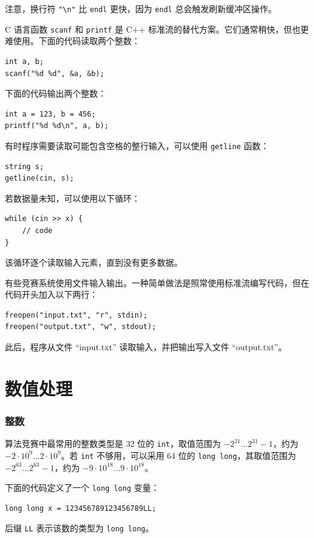 注意，换行符 \texttt{"\textbackslash n"} 比 \texttt{endl} 更快，因为 \texttt{endl} 总会触发刷新缓冲区操作。

C 语言函数 \texttt{scanf} 和 \texttt{printf} 是 C++ 标准流的替代方案。它们通常稍快，但也更难使用。下面的代码读取两个整数：
\begin{lstlisting}
int a, b;
scanf("%d %d", &a, &b);
\end{lstlisting}
下面的代码输出两个整数：
\begin{lstlisting}
int a = 123, b = 456;
printf("%d %d\n", a, b);
\end{lstlisting}

有时程序需要读取可能包含空格的整行输入，可以使用 \texttt{getline} 函数：

\begin{lstlisting}
string s;
getline(cin, s);
\end{lstlisting}

若数据量未知，可以使用以下循环：
\begin{lstlisting}
while (cin >> x) {
    // code
}
\end{lstlisting}
该循环逐个读取输入元素，直到没有更多数据。

有些竞赛系统使用文件输入输出。一种简单做法是照常使用标准流编写代码，但在代码开头加入以下两行：
\begin{lstlisting}
freopen("input.txt", "r", stdin);
freopen("output.txt", "w", stdout);
\end{lstlisting}
此后，程序从文件 ``input.txt'' 读取输入，并把输出写入文件 ``output.txt''。

\section{数值处理}


\subsubsection{整数}

算法竞赛中最常用的整数类型是 32 位的 \texttt{int}，取值范围为 $-2^{31} \ldots 2^{31}-1$，约为 $-2 \cdot 10^9 \ldots 2 \cdot 10^9$。若 \texttt{int} 不够用，可以采用 64 位的 \texttt{long long}，其取值范围为 $-2^{63} \ldots 2^{63}-1$，约为 $-9 \cdot 10^{18} \ldots 9 \cdot 10^{18}$。

下面的代码定义了一个 \texttt{long long} 变量：
\begin{lstlisting}
long long x = 123456789123456789LL;
\end{lstlisting}
后缀 \texttt{LL} 表示该数的类型为 \texttt{long long}。


